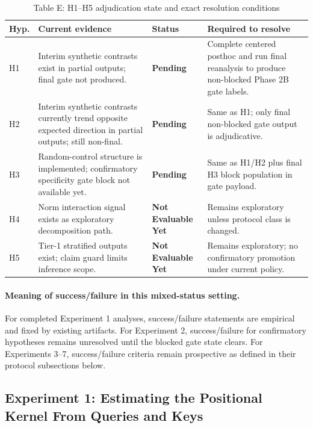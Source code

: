 \documentclass[11pt]{article}
\theoremstyle{definition}
\begin{document}
\begin{table}[ht]
\centering
\caption{Table E: H1--H5 adjudication state and exact resolution conditions}
\small
\begin{tabularx}{\textwidth}{>{\raggedright\arraybackslash}p{}>{\raggedright\arraybackslash}p{}>{\raggedright\arraybackslash}p{}X}
\toprule
\textbf{Hyp.} & \textbf{Current evidence} & \textbf{Status} & \textbf{Required to resolve} \\
\midrule
H1 & Interim synthetic contrasts exist in partial outputs; final gate not produced. & \textbf{Pending} & Complete centered posthoc and run final reanalysis to produce non-blocked Phase 2B gate labels. \\
H2 & Interim synthetic contrasts currently trend opposite expected direction in partial outputs; still non-final. & \textbf{Pending} & Same as H1; only final non-blocked gate output is adjudicative. \\
H3 & Random-control structure is implemented; confirmatory specificity gate block not available yet. & \textbf{Pending} & Same as H1/H2 plus final H3 block population in gate payload. \\
H4 & Norm interaction signal exists as exploratory decomposition path. & \textbf{Not Evaluable Yet} & Remains exploratory unless protocol class is changed. \\
H5 & Tier-1 stratified outputs exist; claim guard limits inference scope. & \textbf{Not Evaluable Yet} & Remains exploratory; no confirmatory promotion under current policy. \\
\bottomrule
\end{tabularx}
\end{table}

\paragraph{Meaning of success/failure in this mixed-status setting.}
For completed Experiment 1 analyses, success/failure statements are empirical and fixed by existing artifacts. For Experiment 2, success/failure for confirmatory hypotheses remains unresolved until the blocked gate state clears. For Experiments 3--7, success/failure criteria remain prospective as defined in their protocol subsections below.

\subsection{Experiment 1: Estimating the Positional Kernel From Queries and Keys}
\label{sec:exp-pos-kernel}
\end{document}
